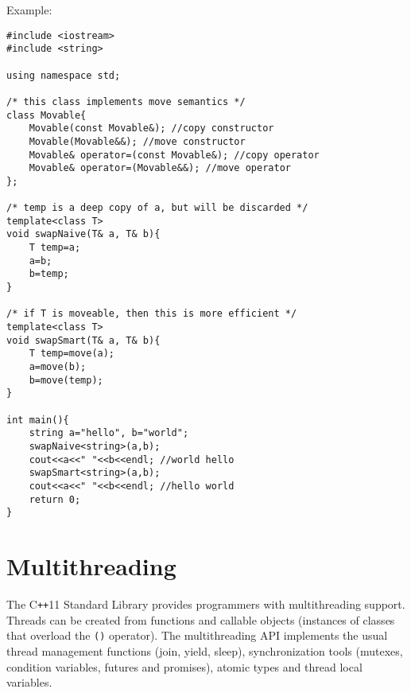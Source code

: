 \documentclass[12pt,a4paper]{article}
\begin{document}
Example:
\vspace{10pt}
\lstset{style=CPP_CODE}
\begin{lstlisting}
#include <iostream>
#include <string>

using namespace std;

/* this class implements move semantics */
class Movable{
    Movable(const Movable&); //copy constructor
    Movable(Movable&&); //move constructor
    Movable& operator=(const Movable&); //copy operator
    Movable& operator=(Movable&&); //move operator
};

/* temp is a deep copy of a, but will be discarded */
template<class T>
void swapNaive(T& a, T& b){
    T temp=a;
    a=b;
    b=temp;
}

/* if T is moveable, then this is more efficient */
template<class T>
void swapSmart(T& a, T& b){
    T temp=move(a);
    a=move(b);
    b=move(temp);
}

int main(){
    string a="hello", b="world";
    swapNaive<string>(a,b);
    cout<<a<<" "<<b<<endl; //world hello
    swapSmart<string>(a,b);
    cout<<a<<" "<<b<<endl; //hello world
    return 0;
}
\end{lstlisting}


\section{Multithreading}

The C\texttt{++}11 Standard Library provides programmers with multithreading support. Threads can be created from functions and callable objects (instances of classes that overload the \lstinline[language=none]|()| operator). The multithreading API implements the usual thread management functions (join, yield, sleep), synchronization tools (mutexes, condition variables, futures and promises), atomic types and thread local variables.
\end{document}

